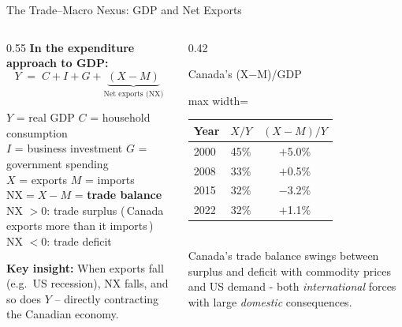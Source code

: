 \documentclass[aspectratio=169]{beamer}
\begin{document}
\begin{frame}{The Trade–Macro Nexus: GDP and Net Exports}
\begin{columns}[T]
\begin{column}{0.55\textwidth}
\textbf{In the expenditure approach to GDP:}
\vspace{0.2em}
\[Y \;=\; C + I + G + \underbrace{(X - M)}_{\text{Net exports (NX)}}\]
\begin{varbox}
\footnotesize
$Y$ = real GDP \hfill $C$ = household consumption\\
$I$ = business investment \hfill $G$ = government spending\\
$X$ = exports \hfill $M$ = imports\\[0.2em]
$\text{NX} = X - M$ \;=\; \textbf{trade balance}\\
NX $>0$: trade surplus (\,Canada exports more than it imports\,)\\
NX $<0$: trade deficit
\end{varbox}
\vspace{0.3em}
\textbf{Key insight:} When exports fall (e.g.\ US recession), NX falls, and so does $Y$ -- directly contracting the Canadian economy.
\end{column}
\begin{column}{0.42\textwidth}
\begin{insight}{Canada's (X$-$M)/GDP}
\footnotesize
\begin{adjustbox}{max width=\columnwidth}
\begin{tabular}{lcc}
\toprule
Year & $X/Y$ & $(X-M)/Y$\\
\midrule
2000 & 45\% & $+$5.0\%\\
2008 & 33\% & $+$0.5\%\\
2015 & 32\% & $-$3.2\%\\
2022 & 32\% & $+$1.1\%\\
\bottomrule
\end{tabular}
\vspace{0.3em}
\end{adjustbox}\\

Canada's trade balance swings between surplus and deficit with commodity prices and US demand - both \emph{international} forces with large \emph{domestic} consequences.
\end{insight}
\end{column}
\end{columns}
\end{frame}
\end{document}
